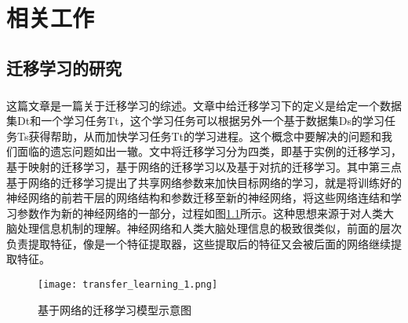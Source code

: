 
\chapter{相关工作}
\section{迁移学习的研究}
\paragraph{}这篇文章\cite{10.1007/978-3-030-01424-7_27}是一篇关于迁移学习的综述。文章中给迁移学习下的定义是给定一个数据集Dt和一个学习任务Tt，这个学习任务可以根据另外一个基于数据集Ds的学习任务Ts获得帮助，从而加快学习任务Tt的学习进程。这个概念中要解决的问题和我们面临的遗忘问题如出一辙。文中将迁移学习分为四类，即基于实例的迁移学习，基于映射的迁移学习，基于网络的迁移学习以及基于对抗的迁移学习。其中第三点基于网络的迁移学习提出了共享网络参数来加快目标网络的学习，就是将训练好的神经网络的前若干层的网络结构和参数迁移至新的神经网络，将这些网络连结和学习参数作为新的神经网络的一部分，过程如图\ref{fig:transfer_learning_1}所示。这种思想来源于对人类大脑处理信息机制的理解。神经网络和人类大脑处理信息的极致很类似，前面的层次负责提取特征，像是一个特征提取器，这些提取后的特征又会被后面的网络继续提取特征。
\begin{figure}
    \centering
    \texttt{[image: transfer\_learning\_1.png]}
    \caption{基于网络的迁移学习模型示意图}
    \label{fig:transfer_learning_1}
\end{figure}
